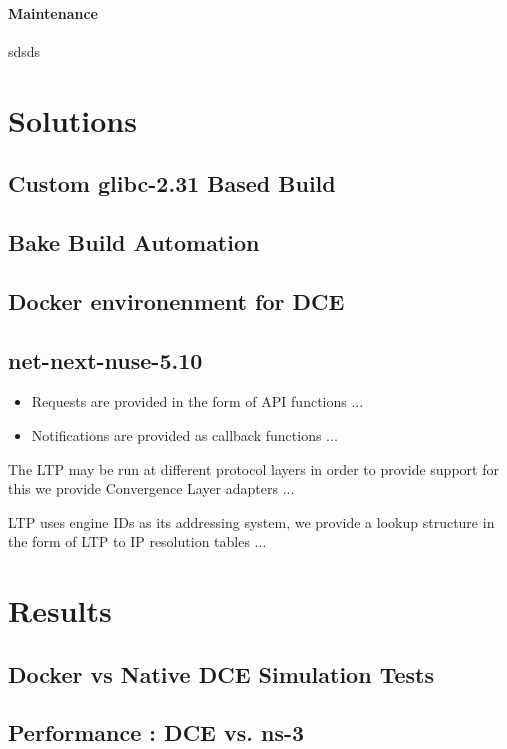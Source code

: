 \documentclass{sig-alternate}
\begin{document}
\paragraph{Maintenance}
sdsds

\section{Solutions}
\label{section:design}

\subsection{Custom glibc-2.31 Based Build}

\subsection{Bake Build Automation}

\subsection{Docker environenment for DCE}

\subsection{net-next-nuse-5.10}


\begin{itemize}
 \item Requests are provided in the form of API functions ...
 \item Notifications are provided as callback functions ...
\end{itemize}

The LTP may be run at different protocol layers in order to provide support for this
we provide Convergence Layer adapters ...

LTP uses engine IDs as its addressing system, we provide a lookup structure in the form of LTP to IP resolution tables ...


\section{Results}

\subsection{Docker vs Native DCE Simulation Tests}

\subsection{Performance : DCE vs. ns-3}
\end{document}
